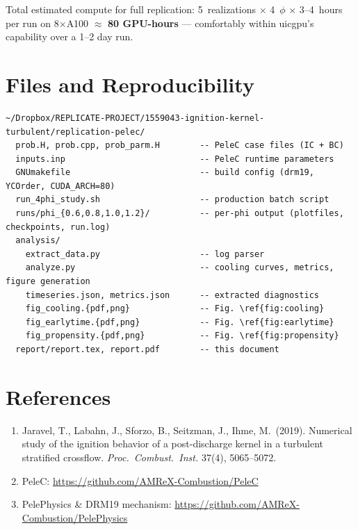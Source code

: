 \documentclass[11pt,a4paper]{article}
\begin{document}
Total estimated compute for full replication: 5~realizations $\times$ 4~$\phi$ $\times$ 3--4~hours per run on 8$\times$A100 $\approx$ \textbf{80 GPU-hours} — comfortably within uicgpu's capability over a 1--2 day run.

\section{Files and Reproducibility}

\begin{verbatim}
~/Dropbox/REPLICATE-PROJECT/1559043-ignition-kernel-turbulent/replication-pelec/
  prob.H, prob.cpp, prob_parm.H        -- PeleC case files (IC + BC)
  inputs.inp                           -- PeleC runtime parameters
  GNUmakefile                          -- build config (drm19, YCOrder, CUDA_ARCH=80)
  run_4phi_study.sh                    -- production batch script
  runs/phi_{0.6,0.8,1.0,1.2}/          -- per-phi output (plotfiles, checkpoints, run.log)
  analysis/
    extract_data.py                    -- log parser
    analyze.py                         -- cooling curves, metrics, figure generation
    timeseries.json, metrics.json      -- extracted diagnostics
    fig_cooling.{pdf,png}              -- Fig. \ref{fig:cooling}
    fig_earlytime.{pdf,png}            -- Fig. \ref{fig:earlytime}
    fig_propensity.{pdf,png}           -- Fig. \ref{fig:propensity}
  report/report.tex, report.pdf        -- this document
\end{verbatim}

\section*{References}
\begin{enumerate}[leftmargin=*]
\item Jaravel, T., Labahn, J., Sforzo, B., Seitzman, J., Ihme, M.\ (2019). Numerical study of the ignition behavior of a post-discharge kernel in a turbulent stratified crossflow. \emph{Proc.\ Combust.\ Inst.} 37(4), 5065--5072.
\item PeleC: \url{https://github.com/AMReX-Combustion/PeleC}
\item PelePhysics \& DRM19 mechanism: \url{https://github.com/AMReX-Combustion/PelePhysics}
\end{enumerate}
\end{document}
